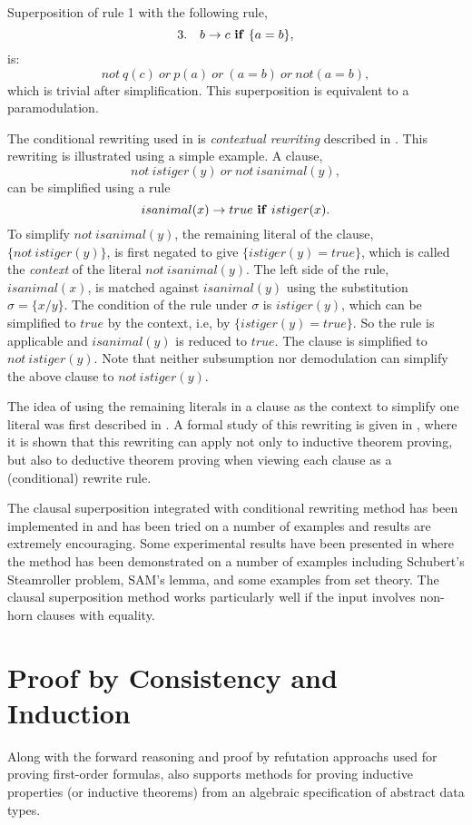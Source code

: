 Superposition of rule 1 with the following rule,
         \[3. ~~~    b \rightarrow c ~ {\bf  if} ~ \{ a = b \}, \]
is:
          \[    not~ q(c) ~or~  p(a) ~or~ (a = b) ~or~ not (a = b), \]
which is trivial after simplification. 
This superposition is equivalent to a paramodulation.

The conditional rewriting used in \RRL is {\em contextual
rewriting} described in \cite{ZK88,Zhang88}.  This rewriting is
illustrated using a simple example.  A clause,
   \[ not~ istiger(y) ~or~ not ~isanimal(y),\]
can be simplified using a rule
   \[ isanimal(x) \rightarrow true ~{\bf if}~ istiger(x). \]
To simplify $not ~isanimal(y)$, the remaining literal of the clause,
$\{ not ~istiger(y) \}$, is first negated to give
$\{ istiger(y) = true \}$, 
which is called the {\em context} of the literal $not~isanimal(y)$.
The left side of the rule, $isanimal(x)$, is matched against
$isanimal(y)$ using the substitution $\sigma = \{ x / y \}$. The
condition of the rule under $\sigma$ is $istiger(y)$, which can
be simplified to $true$ by the context, i.e, by $\{ istiger(y) =
true \}$.  So the rule is applicable and $isanimal(y)$ is reduced
to $true$.  The clause is simplified to $not~istiger(y)$. Note
that neither subsumption nor demodulation can simplify the above
clause to $not ~istiger(y)$.

The idea of using the remaining literals in a clause as the
context to simplify one literal was first described in
\cite{BoyerMoore79}.  A formal study of this rewriting is given
in \cite{ZK88,Zhang88}, where it is shown that this rewriting can
apply not only to inductive theorem proving, but also to
deductive theorem proving when viewing each clause as a
(conditional) rewrite rule.

The clausal superposition integrated with conditional rewriting
method has been implemented in \RRL and has been tried on a
number of examples and results are extremely encouraging. Some
experimental results have been presented in \cite{ZK88} where the
method has been demonstrated on a number of examples including
Schubert's Steamroller problem, SAM's lemma, and some examples
from set theory. The clausal superposition method works
particularly well if the input involves non-horn clauses with
equality.

\section{Proof by Consistency and Induction}

Along with the forward reasoning and proof by refutation
approachs used for proving first-order formulas, \RRL also
supports methods for proving inductive properties (or inductive
theorems) from an algebraic specification of abstract data types.

